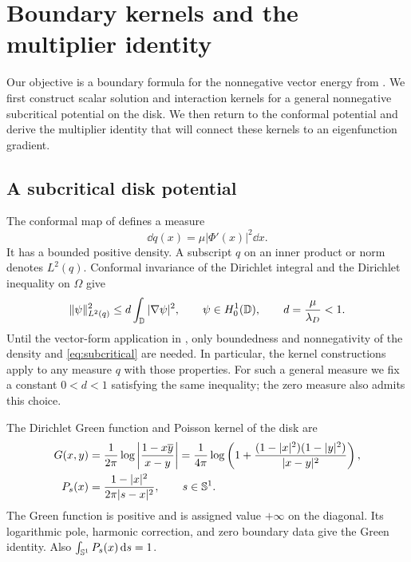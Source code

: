 \section{Boundary kernels and the multiplier identity}\label{sec:boundary}

Our objective is a boundary formula for the nonnegative vector energy from . We first construct scalar solution and interaction kernels for a general nonnegative subcritical potential on the disk. We then return to the conformal potential and derive the multiplier identity that will connect these kernels to an eigenfunction gradient.

\subsection{A subcritical disk potential}

The conformal map of  defines a measure
\begin{equation}\label{eq:q}
\dd q(x)=\mu|\Phi'(x)|^2\dd x.
\end{equation}
It has a bounded positive density. A subscript $q$ on an inner product or norm denotes $L^2(q)$. Conformal invariance of the Dirichlet integral and the Dirichlet inequality on $\Omega$ give
\begin{equation}\label{eq:subcritical}
\lVert \psi\rVert_{L^2(q)}^2\le d\int_\mathbb D|\nabla\psi|^2,
\qquad \psi\in H^1_0(\mathbb D),\qquad d=\frac\mu{\lambda_D}<1.
\end{equation}
Until the vector-form application in , only boundedness and nonnegativity of the density and \eqref{eq:subcritical} are needed. In particular, the kernel constructions apply to any measure $q$ with those properties.
For such a general measure we fix a constant $0<d<1$ satisfying the same inequality; the zero measure also admits this choice.

The Dirichlet Green function and Poisson kernel of the disk are
\begin{align}
G(x,y)&=\frac1{2\pi}\log\left|\frac{1-x\overline y}{x-y}\right|
=\frac1{4\pi}\log\left(1+\frac{(1-|x|^2)(1-|y|^2)}{|x-y|^2}\right),\label{eq:green}\\
P_s(x)&=\frac{1-|x|^2}{2\pi|s-x|^2},\qquad s\in\mathbb S^1.\label{eq:poisson}
\end{align}
The Green function is positive and is assigned value $+\infty$ on the diagonal. Its logarithmic pole, harmonic correction, and zero boundary data give the Green identity. Also $\int_{\mathbb S^1}P_s(x)\,\mathrm d s=1$.

